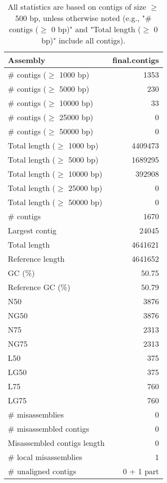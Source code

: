 \documentclass[12pt,a4paper]{article}
\begin{document}
\begin{table}[ht]
\begin{center}
\caption{All statistics are based on contigs of size $\geq$ 500 bp, unless otherwise noted (e.g., "\# contigs ($\geq$ 0 bp)" and "Total length ($\geq$ 0 bp)" include all contigs).}
\begin{tabular}{|l*{1}{|r}|}
\hline
Assembly & final.contigs \\ \hline
\# contigs ($\geq$ 1000 bp) & 1353 \\ \hline
\# contigs ($\geq$ 5000 bp) & 230 \\ \hline
\# contigs ($\geq$ 10000 bp) & 33 \\ \hline
\# contigs ($\geq$ 25000 bp) & 0 \\ \hline
\# contigs ($\geq$ 50000 bp) & 0 \\ \hline
Total length ($\geq$ 1000 bp) & 4409473 \\ \hline
Total length ($\geq$ 5000 bp) & 1689295 \\ \hline
Total length ($\geq$ 10000 bp) & 392908 \\ \hline
Total length ($\geq$ 25000 bp) & 0 \\ \hline
Total length ($\geq$ 50000 bp) & 0 \\ \hline
\# contigs & 1670 \\ \hline
Largest contig & 24045 \\ \hline
Total length & 4641621 \\ \hline
Reference length & 4641652 \\ \hline
GC (\%) & 50.75 \\ \hline
Reference GC (\%) & 50.79 \\ \hline
N50 & 3876 \\ \hline
NG50 & 3876 \\ \hline
N75 & 2313 \\ \hline
NG75 & 2313 \\ \hline
L50 & 375 \\ \hline
LG50 & 375 \\ \hline
L75 & 760 \\ \hline
LG75 & 760 \\ \hline
\# misassemblies & 0 \\ \hline
\# misassembled contigs & 0 \\ \hline
Misassembled contigs length & 0 \\ \hline
\# local misassemblies & 1 \\ \hline
\# unaligned contigs & 0 + 1 part \\ \hline

\end{tabular}
\end{center}
\end{table}
\end{document}
